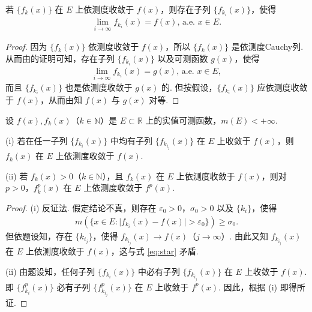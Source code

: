 \documentclass[../../main.tex]{subfiles}
\begin{document}
\begin{theorem}[Riesz(里斯)定理]\label{theorem:Riesz定理}
若 $\{f_k(x)\}$ 在 $E$ 上依测度收敛于 $f(x)$，则存在子列 $\{f_{k_i}(x)\}$，使得
\begin{align*}
\lim_{i\to\infty}f_{k_i}(x)=f(x),\, \text{a.e. }x\in E.
\end{align*}
\end{theorem}
\begin{proof}
因为 $\{f_k(x)\}$ 依测度收敛于 $f(x)$，所以 $\{f_k(x)\}$ 是依测度Cauchy列. 从而由的证明可知，存在子列 $\{f_{k_i}(x)\}$ 以及可测函数 $g(x)$，使得
\begin{align*}
\lim_{i\to\infty}f_{k_i}(x)=g(x),\,\text{a.e. }x\in E,
\end{align*}
而且 $\{f_{k_i}(x)\}$ 也是依测度收敛于 $g(x)$ 的. 但按假设，$\{f_{k_i}(x)\}$ 应依测度收敛于 $f(x)$，从而由知 $f(x)$ 与 $g(x)$ 对等. 
\end{proof}

\begin{example}
设 $f(x),f_k(x)$（$k\in\mathbb{N}$）是 $E\subset\mathbb{R}$ 上的实值可测函数，$m(E)<+\infty$.

(i) 若在任一子列 $\{f_{k_i}(x)\}$ 中均有子列 $\{f_{k_{i_j}}(x)\}$ 在 $E$ 上收敛于 $f(x)$，则 $f_k(x)$ 在 $E$ 上依测度收敛于 $f(x)$.

(ii) 若 $f_k(x)>0$（$k\in\mathbb{N}$），且 $f_k(x)$ 在 $E$ 上依测度收敛于 $f(x)$，则对 $p>0$，$f_k^p(x)$ 在 $E$ 上依测度收敛于 $f^p(x)$.
\end{example}
\begin{proof}
(i) 反证法. 假定结论不真，则存在 $\varepsilon_0>0$，$\sigma_0>0$ 以及 $\{k_i\}$，使得
\begin{align}
m(\{x\in E:\vert f_{k_i}(x)-f(x)\vert>\varepsilon_0\})\geqslant\sigma_0.\label{eq:star}
\end{align}
但依题设知，存在 $\{k_{i_j}\}$，使得 $f_{k_{i_j}}(x)\to f(x)$（$j\to\infty$）. 由此又知 $f_{k_{i_j}}(x)$ 在 $E$ 上依测度收敛于 $f(x)$，这与式 \eqref{eq:star} 矛盾.

(ii) 由题设知，任何子列 $\{f_{k_i}(x)\}$ 中必有子列 $\{f_{k_{i_j}}(x)\}$ 在 $E$ 上收敛于 $f(x)$. 即 $\{f_{k_i}^p(x)\}$ 必有子列 $\{f_{k_{i_j}}^p(x)\}$ 在 $E$ 上收敛于 $f^p(x)$. 因此，根据 (i) 即得所证. 
\end{proof}
\end{document}
